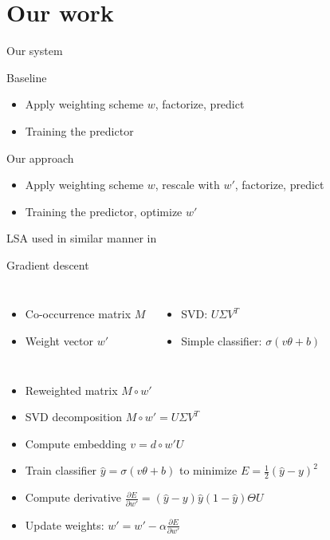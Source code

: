 \documentclass[xcolor={table}]{beamer}
\begin{document}
\section{Our work}
\begin{frame}{Our system}
    \begin{block}{Baseline}
        \begin{itemize}
            \item Apply weighting scheme $w$, factorize, predict 
            \item Training the predictor
        \end{itemize}
    \end{block}

    \begin{block}{Our approach}
        \begin{itemize}
            
            \item Apply weighting scheme $w$, rescale with $w'$, factorize, predict 
            \item Training the predictor, optimize $w'$
        \end{itemize}
    \end{block}
    
    LSA used in similar manner in \cite{ionescu2015training}
\end{frame} 

\begin{frame}{Gradient descent}
    \begin{columns}    
    \begin{itemize}
        \item Co-occurrence matrix $M$
        \item Weight vector $w'$
    \end{itemize}
    \begin{itemize}
        \item SVD: $U \Sigma V^T$
        \item Simple classifier: $\sigma (v \theta + b)$
    \end{itemize}    
    \end{columns}

    \begin{block}{}
    \begin{itemize}
        \item Reweighted matrix $M \circ w'$
        \item SVD decomposition $M \circ w' = U \Sigma V^T$
        \item Compute embedding $v = d \circ w' U$
        \item Train classifier $\hat{y} = \sigma (v \theta + b)$ to minimize $E = \frac{1}{2}(\hat{y}-y)^2$
        \item Compute derivative $\frac{\partial E}{\partial w'} = (\hat{y} -y) \hat{y} (1-\hat{y})\Theta U$
        \item Update weights: $w' = w' - \alpha \frac{\partial E}{\partial w'}$
    \end{itemize}    
    \end{block}
\end{frame} 
\end{document}
